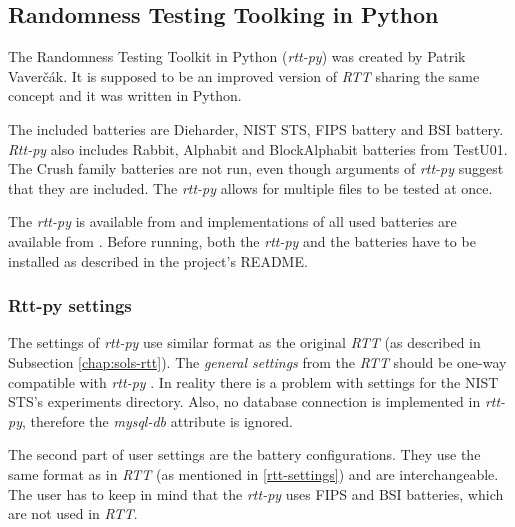 \documentclass[
  digital,     %
  oneside,     %
  nosansbold,  %
  nocolorbold, %
  nolof,         %
  nolot,         %
]{fithesis4}
\begin{document}


\subsection{Randomness Testing Toolking in Python} \label{chap:sols-rtt-py}
The Randomness Testing Toolkit in Python (\emph{rtt-py}) was created by Patrik Vaverčák. It is supposed to be an improved version of \emph{RTT} sharing the same concept \cite[p.~24]{vavercak} and it was written in Python.

The included batteries are Dieharder, NIST STS, FIPS battery and BSI battery. \emph{Rtt-py} also includes Rabbit, Alphabit and BlockAlphabit batteries from TestU01. The Crush family batteries are not run, even though arguments of \emph{rtt-py} suggest that they are included. The \emph{rtt-py} allows for multiple files to be tested at once.


The \emph{rtt-py} is available from \cite{rtt-py-site} and implementations of all used batteries are available from \cite{rtt-py-batteries}. Before running, both the \emph{rtt-py} and the batteries have to be installed as described in the project's README.



\subsubsection{Rtt-py settings}
The settings of \emph{rtt-py} use similar format as the original \emph{RTT} (as described in Subsection \ref{chap:sols-rtt}). The \emph{general settings} from the \emph{RTT} should be one-way compatible with \emph{rtt-py} \cite[p. 25]{vavercak}. In reality there is a problem with settings for the NIST STS's experiments directory. Also, no database connection is implemented in \emph{rtt-py}, therefore the \emph{mysql-db} attribute is ignored. \cite{rtt-py-site}

The second part of user settings are the battery configurations. They use the same format as in \emph{RTT} (as mentioned in \ref{rtt-settings}) and are interchangeable.~\cite[p.~25]{vavercak} The user has to keep in mind that the \emph{rtt-py} uses FIPS and BSI batteries, which are not used in \emph{RTT}. 
\end{document}
